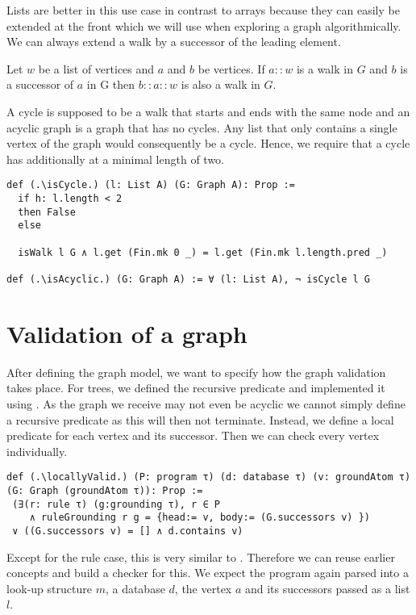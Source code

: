 Lists are better in this use case in contrast to arrays because they can easily be extended at the front which we will use when exploring a graph algorithmically. We can always extend a walk by a successor of the leading element.

\begin{lemma}[\isWalkextendssuccessors]
    Let $w$ be a list of vertices and $a$ and $b$ be vertices.
    If $a::w$ is a walk in $G$ and $b$ is a successor of $a$ in G then $b::a::w$ is also a walk in $G$.
\end{lemma}

A cycle is supposed to be a walk that starts and ends with the same node and an acyclic graph is a graph that has no cycles. Any list that only contains a single vertex of the graph would consequently be a cycle. Hence, we require that a cycle has additionally at a minimal length of two.

\begin{lstlisting}
def (.\isCycle.) (l: List A) (G: Graph A): Prop :=
  if h: l.length < 2
  then False
  else

  isWalk l G ∧ l.get (Fin.mk 0 _) = l.get (Fin.mk l.length.pred _)

def (.\isAcyclic.) (G: Graph A) := ∀ (l: List A), ¬ isCycle l G
\end{lstlisting}

\section{Validation of a graph}

After defining the graph model, we want to specify how the graph validation takes place. For trees, we defined the recursive predicate \isValid and implemented it using \treeValidator. As the graph we receive may not even be acyclic we cannot simply define a recursive predicate as this will then not terminate. Instead, we define a local predicate for each vertex and its successor. Then we can check every vertex individually.

\begin{lstlisting}
def (.\locallyValid.) (P: program τ) (d: database τ) (v: groundAtom τ) (G: Graph (groundAtom τ)): Prop :=
 (∃(r: rule τ) (g:grounding τ), r ∈ P 
    ∧ ruleGrounding r g = {head:= v, body:= (G.successors v) }) 
 ∨ ((G.successors v) = [] ∧ d.contains v)
\end{lstlisting}

Except for the rule case, this is very similar to \isValid. Therefore we can reuse earlier concepts and build a checker for this. We expect the program again parsed into a look-up structure $m$, a database $d$, the vertex $a$ and its successors passed as a list $l$.

